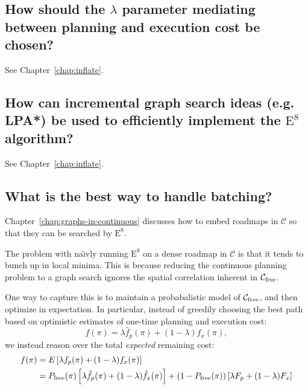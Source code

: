 {
\renewcommand\thesubsection{Q\arabic{subsection}}

\subsection{How should the $\lambda$ parameter mediating
   between planning and execution cost be chosen?}
\label{ques:choosing-lambda}

See Chapter~\ref{chap:inflate}.

\subsection{How can incremental graph search ideas (e.g. LPA*)
   be used to efficiently implement the $\mbox{E}^8$ algorithm?}
\label{ques:incremental-search}

See Chapter~\ref{chap:inflate}.

\subsection{What is the best way to handle batching?}
\label{ques:batching}

Chapter~\ref{chap:graphs-in-continuous}
discusses how to embed roadmaps in $\mathcal{C}$
so that they can be searched by $\mbox{E}^8$.

The problem with na\"{\i}vly running $\mbox{E}^8$ on a
dense roadmap in $\mathcal{C}$
is that it tends to bunch up in local minima.
This is because reducing the continuous planning problem
to a graph search ignores the spatial correlation
inherent in $\mathcal{C}_{\mbox{\scriptsize free}}$.

One way to capture this is to maintain a probabalistic model
of $\mathcal{C}_{\mbox{\scriptsize free}}$,
and then optimize in expectation.
In particular,
instead of greedily choosing the best path based on
optimistic estimates of one-time planning and execution cost:
\begin{equation}
   f(\pi) = \lambda \hat{f}_p(\pi) + (1-\lambda) \hat{f}_x(\pi),
\end{equation}
we instead reason over the total \emph{expected} remaining cost:
\begin{align}
   f(\pi)
      &= E \left[ \lambda f_p(\pi) + (1-\lambda) f_x(\pi) \right] \\
   &= P_{\mbox{\scriptsize free}}(\pi)
      \left[ \lambda \hat{f}_p(\pi) + (1-\lambda) \hat{f}_x(\pi) \right]
      + (1-P_{\mbox{\scriptsize free}}(\pi))
      \left[ \lambda F_p + (1-\lambda) F_x \right]
\end{align}

}
